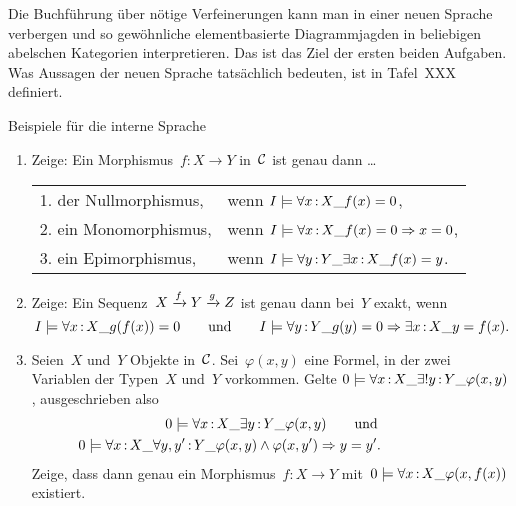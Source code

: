\documentclass{uebblatt}
\begin{document}
Die Buchführung über nötige Verfeinerungen kann man in einer neuen Sprache
verbergen und so gewöhnliche elementbasierte Diagrammjagden in beliebigen
abelschen Kategorien interpretieren. Das ist das Ziel der ersten beiden
Aufgaben. Was Aussagen der neuen Sprache tatsächlich bedeuten, ist in Tafel~XXX
definiert.

\newpage

\begin{aufgabe}{Beispiele für die interne Sprache}
\begin{enumerate}
\item Zeige: Ein Morphismus~$f : X \to Y$ in~$\mathcal{C}$ ist genau dann \ldots

\renewcommand{\arraystretch}{1.2}
\begin{tabular}{ll}
  1. der Nullmorphismus, & wenn
  $I \models \forall x\,{:}\,X\_ f(x) = 0$, \\
  2. ein Monomorphismus, & wenn
  $I \models \forall x\,{:}\,X\_ f(x) = 0 \Rightarrow x = 0$, \\
  3. ein Epimorphismus, & wenn
  $I \models \forall y\,{:}\,Y\_ \exists x\,{:}\,X\_ f(x) = y$.
\end{tabular}

\item Zeige: Ein Sequenz~$X \xrightarrow{f} Y \xrightarrow{g} Z$ ist genau dann bei~$Y$ exakt,
wenn
\[ I \models \forall x\,{:}\,X\_ g(f(x)) = 0
  \qquad\text{und}\qquad
  I \models \forall y\,{:}\,Y\_ g(y) = 0 \Rightarrow \exists x\,{:}\,X\_ y = f(x). \]

\item Seien~$X$ und~$Y$ Objekte in~$\mathcal{C}$. Sei~$\varphi(x,y)$ eine Formel, in der
zwei Variablen der Typen~$X$ und~$Y$ vorkommen. Gelte
$0 \models \forall x\,{:}\,X\_ \exists!y\,{:}\,Y\_ \varphi(x,y)$, ausgeschrieben also
\begin{multline*}0 \models \forall x\,{:}\,X\_ \exists y\,{:}\,Y\_ \varphi(x,y)
  \qquad\text{und} \\
  0 \models \forall x\,{:}\,X\_ \forall y,y'\,{:}\,Y\_ \varphi(x,y) \wedge \varphi(x,y')
  \Rightarrow y = y'. {\qquad\qquad\qquad} \end{multline*}
Zeige, dass dann genau ein Morphismus~$f : X \to Y$ mit~$0 \models \forall
x\,{:}\,X\_ \varphi(x,f(x))$ existiert.
\end{enumerate}
\end{aufgabe}
\end{document}
